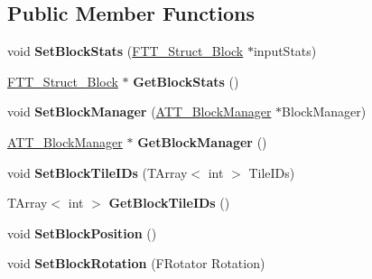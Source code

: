 \subsection*{Public Member Functions}
\begin{DoxyCompactItemize}
\item 
\mbox{\label{class_a_t_t___block_a4a097329802b4d63e9c708d069843169}} 
void {\bfseries Set\+Block\+Stats} (\mbox{\hyperlink{struct_f_t_t___struct___block}{F\+T\+T\+\_\+\+Struct\+\_\+\+Block}} $\ast$input\+Stats)
\item 
\mbox{\label{class_a_t_t___block_a2c7cd8800fdbadc63e460658e4e5f3d3}} 
\mbox{\hyperlink{struct_f_t_t___struct___block}{F\+T\+T\+\_\+\+Struct\+\_\+\+Block}} $\ast$ {\bfseries Get\+Block\+Stats} ()
\item 
\mbox{\label{class_a_t_t___block_aa2a444fac806d268d15c09751473f649}} 
void {\bfseries Set\+Block\+Manager} (\mbox{\hyperlink{class_a_t_t___block_manager}{A\+T\+T\+\_\+\+Block\+Manager}} $\ast$Block\+Manager)
\item 
\mbox{\label{class_a_t_t___block_a25f3eecca91dcd7c4583f7c72c90e0a5}} 
\mbox{\hyperlink{class_a_t_t___block_manager}{A\+T\+T\+\_\+\+Block\+Manager}} $\ast$ {\bfseries Get\+Block\+Manager} ()
\item 
\mbox{\label{class_a_t_t___block_a3395de2efc0cc095a213ddb69e0e33f4}} 
void {\bfseries Set\+Block\+Tile\+I\+Ds} (T\+Array$<$ int $>$ Tile\+I\+Ds)
\item 
\mbox{\label{class_a_t_t___block_a27ea4c7ff41625038956617233566879}} 
T\+Array$<$ int $>$ {\bfseries Get\+Block\+Tile\+I\+Ds} ()
\item 
\mbox{\label{class_a_t_t___block_a9db7bb9b5388ced0eeeac6fb63563052}} 
void {\bfseries Set\+Block\+Position} ()
\item 
\mbox{\label{class_a_t_t___block_ad6fe96136dfc8e1ad6db471230e838cf}} 
void {\bfseries Set\+Block\+Rotation} (F\+Rotator Rotation)
\item 
\mbox{\label{class_a_t_t___block_a25b0aa10d24cf29f44133b41ddeff687}} 

\end{DoxyCompactItemize}
